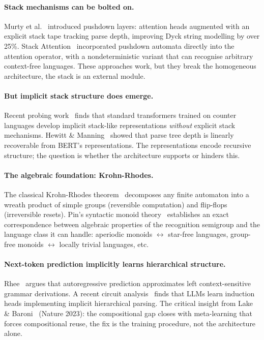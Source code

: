 \documentclass[11pt, a4paper]{article}
\theoremstyle{plain}
\theoremstyle{definition}
\theoremstyle{remark}
\begin{document}
\paragraph{Stack mechanisms can be bolted on.}
Murty et al.~\cite{murty2023pushdown} introduced pushdown layers: attention heads augmented with an explicit stack tape tracking parse depth, improving Dyck string modelling by over 25\%.
Stack Attention~\cite{yao2024stack} incorporated pushdown automata directly into the attention operator, with a nondeterministic variant that can recognise arbitrary context-free languages.
These approaches work, but they break the homogeneous architecture, the stack is an external module.

\paragraph{But implicit stack structure does emerge.}
Recent probing work~\cite{emergent2025stack} finds that standard transformers trained on counter languages develop implicit stack-like representations \emph{without} explicit stack mechanisms.
Hewitt \& Manning~\cite{hewitt2019probe} showed that parse tree depth is linearly recoverable from BERT's representations.
The representations encode recursive structure; the question is whether the architecture supports or hinders this.

\paragraph{The algebraic foundation: Krohn-Rhodes.}
The classical Krohn-Rhodes theorem~\cite{krohnrhodes1965} decomposes any finite automaton into a wreath product of simple groups (reversible computation) and flip-flops (irreversible resets).
Pin's syntactic monoid theory~\cite{pin1986} establishes an exact correspondence between algebraic properties of the recognition semigroup and the language class it can handle: aperiodic monoids $\leftrightarrow$ star-free languages, group-free monoids $\leftrightarrow$ locally trivial languages, etc.

\paragraph{Next-token prediction implicitly learns hierarchical structure.}
Rhee~\cite{rhee2025csg} argues that autoregressive prediction approximates left context-sensitive grammar derivations.
A recent circuit analysis~\cite{circuit2025hierarchy} finds that LLMs learn induction heads implementing implicit hierarchical parsing.
The critical insight from Lake \& Baroni~\cite{lake2023meta} (Nature 2023): the compositional gap closes with meta-learning that forces compositional reuse, the fix is the training procedure, not the architecture alone.
\end{document}
